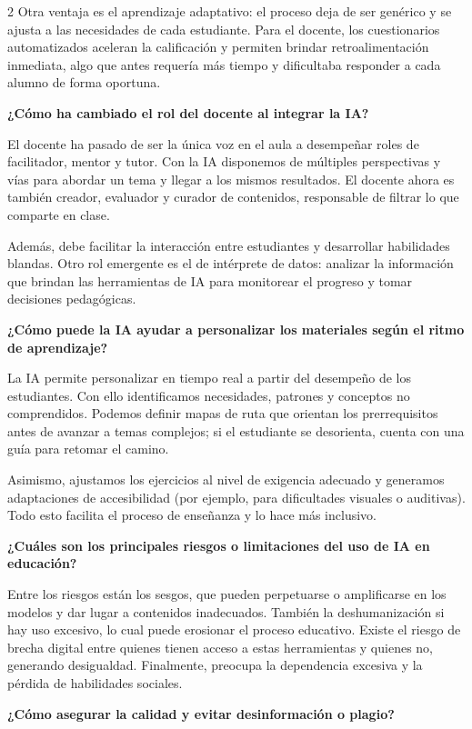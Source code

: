 \documentclass[12pt,spanish,Letterpaper,openany]{book}
\begin{document}
\begin {multicols}{2}
Otra ventaja es el aprendizaje adaptativo: el proceso deja de ser genérico y se ajusta a las necesidades de cada estudiante. Para el docente, los cuestionarios automatizados aceleran la calificación y permiten brindar retroalimentación inmediata, algo que antes requería más tiempo y dificultaba responder a cada alumno de forma oportuna.

\textbf{¿Cómo ha cambiado el rol del docente al integrar la IA?}

El docente ha pasado de ser la única voz en el aula a desempeñar roles de facilitador, mentor y tutor. Con la IA disponemos de múltiples perspectivas y vías para abordar un tema y llegar a los mismos resultados. El docente ahora es también creador, evaluador y curador de contenidos, responsable de filtrar lo que comparte en clase.

Además, debe facilitar la interacción entre estudiantes y desarrollar habilidades blandas. Otro rol emergente es el de intérprete de datos: analizar la información que brindan las herramientas de IA para monitorear el progreso y tomar decisiones pedagógicas.

\textbf{¿Cómo puede la IA ayudar a personalizar los materiales según el ritmo de aprendizaje?}

La IA permite personalizar en tiempo real a partir del desempeño de los estudiantes. Con ello identificamos necesidades, patrones y conceptos no comprendidos. Podemos definir mapas de ruta que orientan los prerrequisitos antes de avanzar a temas complejos; si el estudiante se desorienta, cuenta con una guía para retomar el camino.

Asimismo, ajustamos los ejercicios al nivel de exigencia adecuado y generamos adaptaciones de accesibilidad (por ejemplo, para dificultades visuales o auditivas). Todo esto facilita el proceso de enseñanza y lo hace más inclusivo.

\textbf{¿Cuáles son los principales riesgos o limitaciones del uso de IA en educación?}

Entre los riesgos están los sesgos, que pueden perpetuarse o amplificarse en los modelos y dar lugar a contenidos inadecuados. También la deshumanización si hay uso excesivo, lo cual puede erosionar el proceso educativo. Existe el riesgo de brecha digital entre quienes tienen acceso a estas herramientas y quienes no, generando desigualdad. Finalmente, preocupa la dependencia excesiva y la pérdida de habilidades sociales.

\textbf{¿Cómo asegurar la calidad y evitar desinformación o plagio?}


\end{multicols}
\end{document}
